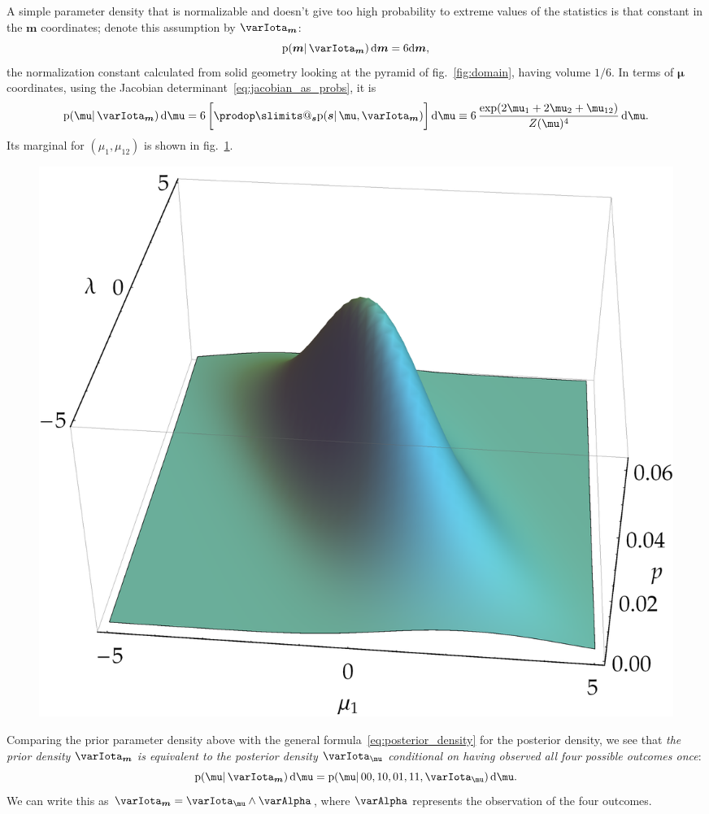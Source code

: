 \documentclass[\ifafour a4paper,12pt,\else a5paper,10pt,\fi%
onecolumn,oneside,article,%
british%
]{memoir}
\makeatletter
\theoremstyle{remark}
\theoremstyle{innote}
\def\prod{\DOTSI\prodop\slimits@}
\newcommand*{\di}{\mathrm{d}}%
\newcommand*{\pf}{\mathrm{p}}%
\renewcommand*{\|}{\mathpunct{|}}
\newcommand*{\fig}{fig.}%
\newcommand*{\yI}{\varIota}
\newcommand*{\ys}{\bm{s}}
\newcommand*{\yA}{\varAlpha}
\newcommand*{\la}{\mu_{12}}
\newcommand*{\yth}{\bm{\mu}}
\newcommand*{\yt}{\bm{m}}
\newcommand*{\yIth}{\yI_{\yth}}
\newcommand*{\yIt}{\yI_{\yt}}
\makeatother
\begin{document}
\bigskip

A simple parameter density that is normalizable and doesn't give too high
probability to extreme values of the statistics is that constant in the
$\yt$ coordinates; denote this assumption by $\yIt$:
\begin{equation}
  \label{eq:density_constant_statistics}
  \pf(\yt \| \yIt)\,\di\yt = 6 \di\yt,
\end{equation}
the normalization constant calculated from solid geometry looking at the
pyramid of \fig~\ref{fig:domain}, having volume $1/6$. In terms of $\yth$
coordinates, using the Jacobian determinant~\eqref{eq:jacobian_as_probs},
it is
\begin{equation}
  \label{eq:density_constant_statistics_first_coords}
  \pf(\yth \|\yIt)\,\di\yth =
  6\,\biggl[ \prod_{\ys}\pf(\ys \|\yth,\yIt) \biggr]\,\di\yth
  \equiv
6\,  \frac{\exp(2\mu_1 + 2\mu_2 + \la)}{Z(\yth)^4}\,\di\yth.
\end{equation}
Its marginal for $(\mu_1,\la)$ is shown in
\fig~\ref{fig:marginal_flatstat}.
\begin{figure}[t!]%
  \centering\includegraphics[width=0.75\linewidth]{marginal_flatstat.png}\\
  \caption{}
  \label{fig:marginal_flatstat}
\end{figure}%

Comparing the prior parameter density above with the general
formula~\eqref{eq:posterior_density} for the posterior density, we see that
\emph{the prior density $\yIt$  is equivalent to the posterior density
  $\yIth$ conditional on having observed all four possible outcomes once}:
\begin{equation}
  \label{eq:equivalence_prior_postdata}
  \pf(\yth \|\yIt)\,\di\yth =
\pf(\yth \| 00,10,01,11,\yIth)\,\di\yth.
\end{equation}
We can write this as $\yIt = \yIth \land \yA$, where $\yA$ represents the
observation of the four outcomes.
\end{document}
